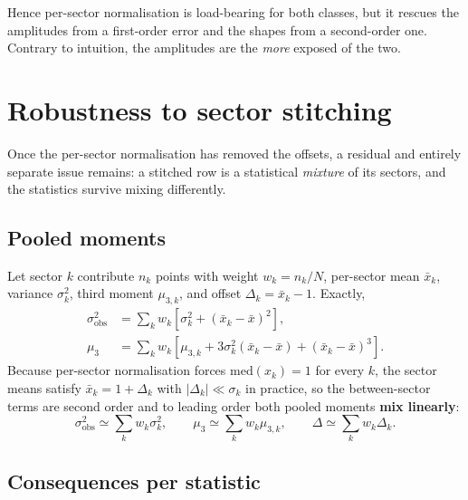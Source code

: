 \documentclass[11pt]{article}
\newcommand{\sigobs}{\sigma_{\mathrm{obs}}}
\begin{document}
Hence per-sector normalisation is load-bearing for both classes, but it rescues
the amplitudes from a first-order error and the shapes from a second-order one.
Contrary to intuition, the amplitudes are the \emph{more} exposed of the two.

\section{Robustness to sector stitching}

Once the per-sector normalisation has removed the offsets, a residual and
entirely separate issue remains: a stitched row is a statistical \emph{mixture}
of its sectors, and the statistics survive mixing differently.

\subsection{Pooled moments}

Let sector $k$ contribute $n_k$ points with weight $w_k = n_k/N$, per-sector mean
$\bar{x}_k$, variance $\sigma_k^2$, third moment $\mu_{3,k}$, and offset
$\Delta_k = \bar{x}_k - 1$. Exactly,
%
\begin{align}
  \sigobs^{2} &= \sum_k w_k \left[\sigma_k^{2}
                 + (\bar{x}_k - \bar{x})^{2}\right],
  \label{eq:poolvar}\\
  \mu_3       &= \sum_k w_k \left[\mu_{3,k}
                 + 3\sigma_k^{2}(\bar{x}_k - \bar{x})
                 + (\bar{x}_k - \bar{x})^{3}\right].
  \label{eq:poolmu3}
\end{align}
%
Because per-sector normalisation forces $\mathrm{med}(x_k) = 1$ for every $k$,
the sector means satisfy $\bar{x}_k = 1 + \Delta_k$ with $|\Delta_k| \ll
\sigma_k$ in practice, so the between-sector terms are second order and to
leading order both pooled moments \textbf{mix linearly}:
%
\begin{equation}
  \sigobs^{2} \simeq \sum_k w_k \sigma_k^{2},
  \qquad
  \mu_3 \simeq \sum_k w_k \mu_{3,k},
  \qquad
  \Delta \simeq \sum_k w_k \Delta_k .
  \label{eq:linearmix}
\end{equation}

\subsection{Consequences per statistic}
\end{document}
